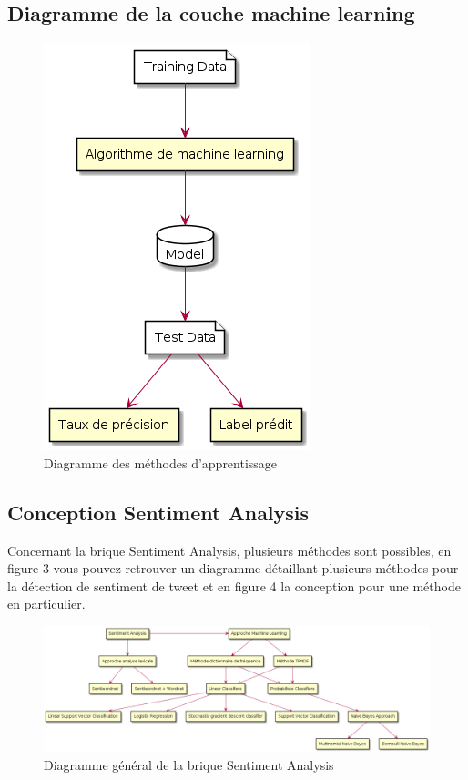 \subsection {Diagramme de la couche machine learning}
\begin{figure}[h!]
	\centerline{\includegraphics[scale=0.8]{img/diagramme_machine_learning.png}}
	\caption{Diagramme des méthodes d'apprentissage}
\end{figure}
\newpage


\subsection {Conception Sentiment Analysis}

\par Concernant la brique Sentiment Analysis, plusieurs méthodes sont possibles, en figure 3 vous pouvez retrouver un diagramme détaillant plusieurs méthodes pour la détection de sentiment de tweet et en figure 4 la conception pour une méthode en particulier. \\


\begin{figure}[h!]
	\centerline{\includegraphics[scale=0.4]{img/diagramme_sentiment_analysis.png}}
	\caption{Diagramme général de la brique Sentiment Analysis}
\end{figure}


